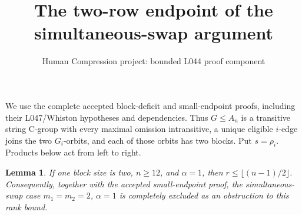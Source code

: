 \documentclass[11pt,a4paper]{article}
\title{The two-row endpoint of the simultaneous-swap argument}
\author{Human Compression project: bounded L044 proof component}
\date{}
\newtheorem{lemma}{Lemma}
\begin{document}
\maketitle
We use the complete accepted block-deficit and small-endpoint
proofs, including their L047/Whiston hypotheses and dependencies.
Thus $G\leq A_n$ is a transitive string C-group with every
maximal omission intransitive, a unique eligible $i$-edge joins
the two $G_i$-orbits, and each of those orbits has two blocks.
Put $s=\rho_i$. Products below act from left to right.

\begin{lemma}
If one block size is two, $n\geq12$, and $\alpha=1$, then
$r\leq\lfloor(n-1)/2\rfloor$. Consequently, together with the
accepted small-endpoint proof, the simultaneous-swap case
$m_1=m_2=2$, $\alpha=1$ is completely excluded as an obstruction
to this rank bound.
\end{lemma}
\end{document}
